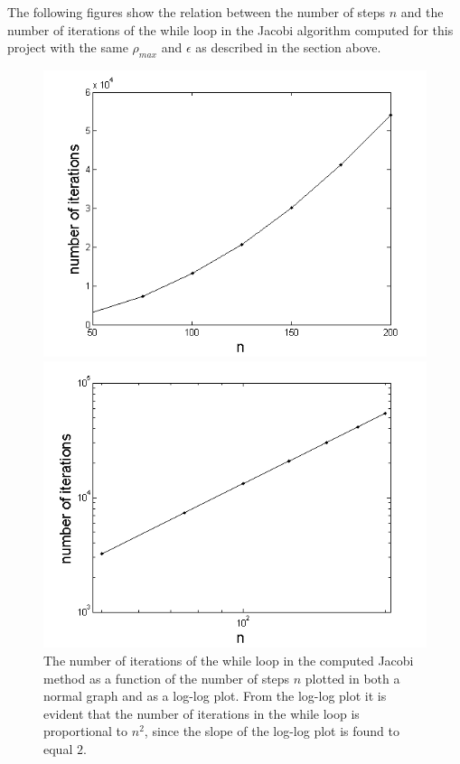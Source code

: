 The following figures show the relation between the number of steps $n$ and the number of iterations of the while loop in the Jacobi algorithm computed for this project with the same $\rho_{max}$ and $\epsilon$ as described in the section above.
\begin{figure}[H]
\centering
\begin{minipage}{.5\textwidth}
  \centering
  \includegraphics[width=1\linewidth]{Figures/NumberOfIterations.png}
\end{minipage}%
\begin{minipage}{.5\textwidth}
  \centering
  \includegraphics[width=1\linewidth]{Figures/NumberOfIterationsLogLog.png}
\end{minipage}
\caption{The number of iterations of the while loop in the computed Jacobi method as a function of the number of steps $n$ plotted in both a normal graph and as a log-log plot. From the log-log plot it is evident that the number of iterations in the while loop is proportional to $n^2$, since the slope of the log-log plot is found to equal $2$.}
\label{fig:DependenceOnNumberOfIterations1}
\end{figure}
